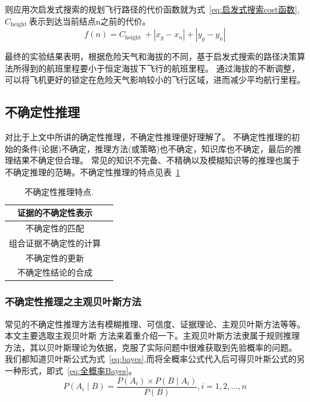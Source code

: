 \documentclass[12pt,a4paper,UTF8]{ctexart}
\begin{document}
则应用次启发式搜索的规划飞行路径的代价函数就为式~\ref{eq:启发式搜索cost函数},$ C_{\text {height }} $表示到达当前结点n之前的代价。
\begin{equation}
    f(n)=C_{\text {height }}+\left|x_g-x_n\right|+\left|y_g-y_n\right|
    \label{eq:启发式搜索cost函数}
\end{equation}

最终的实验结果表明，根据危险天气和海拔的不同，基于启发式搜索的路径决策算法所得到的航班里程要小于恒定海拔下飞行的航班里程。
通过海拔的不断调整，可以将飞机更好的锁定在危险天气影响较小的飞行区域，进而减少平均航行里程\cite{hePathPlanningMethod2019}。

\subsection{不确定性推理}
对比于上文中所讲的确定性推理，不确定性推理便好理解了。
不确定性推理的初始的条件(论据)不确定，推理方法(或策略)也不确定，知识库也不确定，最后的推理结果不确定但合理。
常见的知识不完备、不精确以及模糊知识等的推理也属于不确定推理的范畴。不确定性推理的特点见表~\ref{table:bqdx特点}
\begin{table}[htb]
    \centering
    \caption{不确定性推理特点.}
    \label{table:bqdx特点}
    \begin{tabular}{@{}cc@{}}
    \toprule
    证据的不确定性表示                       \\ \hline
    不确定性的匹配                         \\ \hline
    \multicolumn{1}{l}{组合证据不确定性的计算} \\ \hline
    不确定性的更新                         \\ \hline
    不确定性结论的合成                       \\ \hline
    \toprule
    \end{tabular}
\end{table}
\subsubsection{不确定性推理之主观贝叶斯方法}
常见的不确定性推理方法有模糊推理、可信度、证据理论、主观贝叶斯方法等等。本文主要选取主观贝叶斯
方法来着重介绍一下。主观贝叶斯方法隶属于规则推理方法，其以贝叶斯理论为依据，克服了实际问题中很难获取到先验概率的问题。\cite{gonenComparingObjectiveSubjective2019}\cite{uzunogluAdaptiveBayesianApproach2020a}
我们都知道贝叶斯公式为式~\ref{eq:bayes},而将全概率公式代入后可得贝叶斯公式的另一种形式，即式~\ref{eq:全概率Bayes}。
\begin{equation}
    P\left(A_i \mid B\right)=\frac{P\left(A_i\right) \times P\left(B \mid A_i\right)}{P(B)}, i=1,2, \ldots, n
    \label{eq:bayes}
\end{equation}
\end{document}
